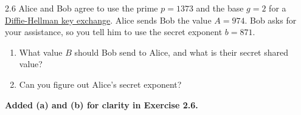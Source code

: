 
\begin{exercise}
    {2.6} Alice and Bob agree to use the prime \(p = 1373\) and the base \(g = 2\) for a \hyperref[d-h key]{Diffie-Hellman key exchange}. Alice sends Bob the value \(A = 974\). Bob asks for your assistance, so you tell him to use the secret exponent \(b = 871\).
    \begin{enumerate}
        \item What value \(B\) should Bob send to Alice, and what is their secret shared value?
        \item Can you figure out Alice's secret exponent?
    \end{enumerate}
\end{exercise}

\begin{center}
    \textbf{Added (a) and (b) for clarity in Exercise 2.6.}
\end{center}


